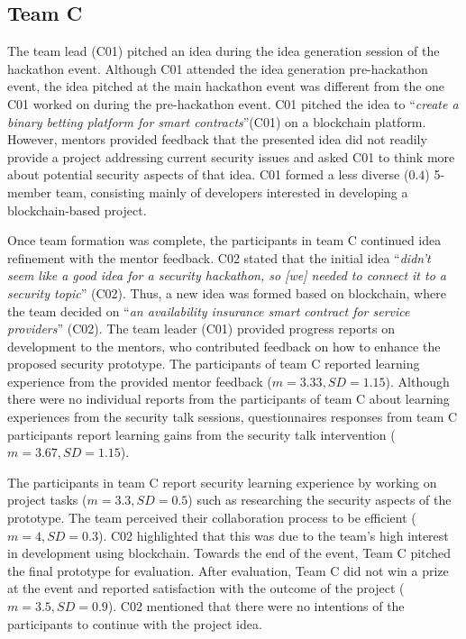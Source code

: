 \documentclass[runningheads]{llncs}
\begin{document}
\subsection{Team C}
The team lead (C01) pitched an idea during the idea generation session of the hackathon event. Although C01 attended the idea generation pre-hackathon event, the idea pitched at the main hackathon event was different from the one C01 worked on during the pre-hackathon event. C01 pitched the idea to ``\textit{create a binary betting platform for smart contracts}''(C01) on a blockchain platform. However, mentors provided feedback that the presented idea did not readily provide a project addressing current security issues and asked C01 to think more about potential security aspects of that idea. C01 formed a less diverse ($\textit{0.4}$) 5-member team, consisting mainly of developers interested in developing a blockchain-based project.

Once team formation was complete, the participants in team C continued idea refinement with the mentor feedback. C02 stated that the initial idea ``\textit{didn't seem like a good idea for a security hackathon, so [we] needed to connect it to a security topic}'' (C02). Thus, a new idea was formed based on blockchain, where the team decided on ``\textit{an availability insurance smart contract for service providers}'' (C02). The team leader (C01) provided progress reports on development to the mentors, who contributed feedback on how to enhance the proposed security prototype. The participants of team C reported learning experience from the provided mentor feedback ($m = 3.33,SD=1.15$). Although there were no individual reports from the participants of team C about learning experiences from the security talk sessions, questionnaires responses from team C participants report learning gains from the security talk intervention ($m = 3.67,SD=1.15$).

The participants in team C report security learning experience by working on project tasks ($m = 3.3,SD=0.5$) such as researching the security aspects of the prototype. The team perceived their collaboration process to be efficient ($m=4, SD=0.3$). C02 highlighted that this was due to the team's high interest in development using blockchain. Towards the end of the event, Team C pitched the final prototype for evaluation. After evaluation, Team C did not win a prize at the event and reported satisfaction with the outcome of the project ($m=3.5, SD=0.9$). C02 mentioned that there were no intentions of the participants to continue with the project idea.
\end{document}
